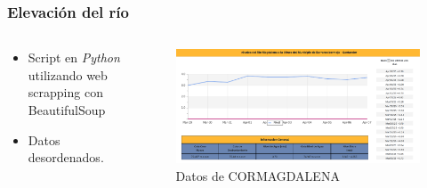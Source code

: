 \documentclass[17pt, t, lualatex]{beamer}
\begin{document}
\begin{frame}
  \frametitle{Elevación del río}

  \begin{columns}
    \begin{column}{.3\textwidth}
      \begin{itemize}
        \item Script en \textit{Python} utilizando web scrapping con BeautifulSoup
        \item Datos desordenados.
      \end{itemize}
    \end{column}

    \begin{column}{.7\textwidth}
      \begin{figure}[ht]
        \centering
        \includegraphics[width=1\textwidth]{img/Barran.png}
        \caption{Datos de CORMAGDALENA\cite{cormagdalena_niveles}}
      \end{figure}
    \end{column}
  \end{columns}

\end{frame}
\end{document}
